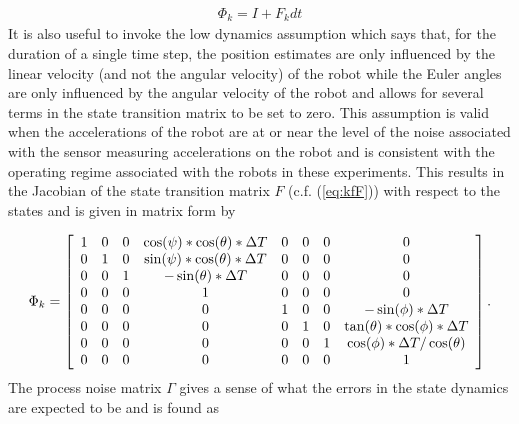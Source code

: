 \begin{align}
\label{eq:kflinearexpansion}
\Phi_k = I + F_kdt
\end{align}
It is also useful to invoke the low dynamics assumption which says that, for the duration of a single time step, the position estimates are only influenced by the linear velocity (and not the angular velocity) of the robot while the Euler angles are only influenced by the angular velocity of the robot and allows for several terms in the state transition matrix to be set to zero. This assumption is valid when the accelerations of the robot are at or near the level of the noise associated with the sensor measuring accelerations on the robot and is consistent with the operating regime associated with the robots in these experiments. This results in the Jacobian of the state transition matrix $F$ (c.f. (\ref{eq:kfF})) with respect to the states and is given in matrix form by

\begin{align*}
\Phi_k = \left[\begin{array}{c c c c c c c c}
1 & 0 & 0 & \cos(\psi)*\cos(\theta)*\Delta T & 0 & 0 & 0 & 0 \\
0 & 1 & 0 & \sin(\psi)*\cos(\theta)*\Delta T & 0 & 0 & 0 & 0\\
0 & 0 & 1 & -\sin(\theta)*\Delta T & 0 & 0 & 0 & 0\\
0 & 0 & 0 & 1 & 0 & 0 & 0 & 0 \\
0 & 0 & 0 & 0 & 1 & 0 & 0 & -\sin(\phi)*\Delta T \\
0 & 0 & 0 & 0 & 0 & 1 & 0 & \tan(\theta)*\cos(\phi)*\Delta T \\
0 & 0 & 0 & 0 & 0 & 0 & 1 & \cos(\phi)*\Delta T/\cos(\theta) \\
0 & 0 & 0 & 0 & 0 & 0 & 0 & 1
\end{array}\right].
\end{align*}
The process noise matrix $\Gamma$ gives a sense of what the errors in the state dynamics are expected to be and is found as

